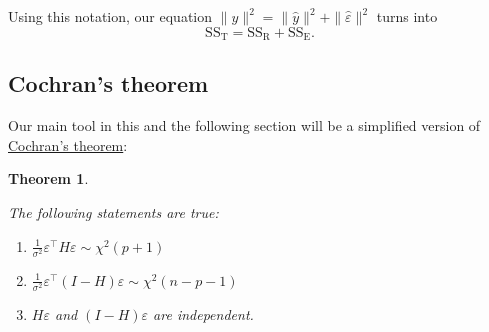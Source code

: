 \documentclass[
  a4paper,
]{article}
\newtheorem{theorem}{Theorem}[section]
\theoremstyle{definition}
\theoremstyle{definition}
\theoremstyle{definition}
\theoremstyle{definition}
\theoremstyle{remark}
\begin{document}
Using this notation, our equation
\(\|y\|^2 = \|\hat y\|^2 + \|\hat\varepsilon\|^2\)
turns into
\begin{equation*}
  \mathrm{SS}_\mathrm{T}
  = \mathrm{SS}_\mathrm{R} + \mathrm{SS}_\mathrm{E}.
\end{equation*}

\hypertarget{Cochran}{%
\subsection{Cochran's theorem}\label{Cochran}}

Our main tool in this and the following section will be a simplified
version of \href{https://en.wikipedia.org/wiki/Cochran\%27s_theorem}{Cochran's theorem}:

\begin{theorem}
\protect\hypertarget{thm:Cochran}{}\label{thm:Cochran}

The following statements are true:

\begin{enumerate}
\def\labelenumi{\arabic{enumi})}
\item
  \(\frac{1}{\sigma^2} \varepsilon^\top H \varepsilon\sim \chi^2(p+1)\)
\item
  \(\frac{1}{\sigma^2} \varepsilon^\top (I - H) \varepsilon\sim \chi^2(n - p - 1)\)
\item
  \(H \varepsilon\) and \((I-H)\varepsilon\) are independent.
\end{enumerate}

\end{theorem}
\end{document}
